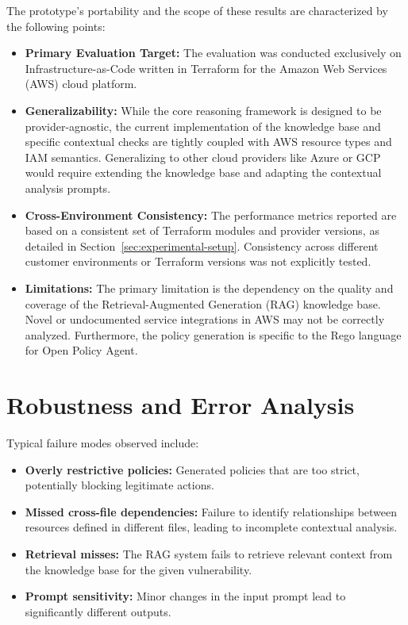 The prototype's portability and the scope of these results are characterized by the following points:
\begin{itemize}
    \item \textbf{Primary Evaluation Target:} The evaluation was conducted exclusively on Infrastructure-as-Code written in Terraform for the Amazon Web Services (AWS) cloud platform.
    \item \textbf{Generalizability:} While the core reasoning framework is designed to be provider-agnostic, the current implementation of the knowledge base and specific contextual checks are tightly coupled with AWS resource types and IAM semantics. Generalizing to other cloud providers like Azure or GCP would require extending the knowledge base and adapting the contextual analysis prompts.
    \item \textbf{Cross-Environment Consistency:} The performance metrics reported are based on a consistent set of Terraform modules and provider versions, as detailed in Section~\ref{sec:experimental-setup}. Consistency across different customer environments or Terraform versions was not explicitly tested.
    \item \textbf{Limitations:} The primary limitation is the dependency on the quality and coverage of the Retrieval-Augmented Generation (RAG) knowledge base. Novel or undocumented service integrations in AWS may not be correctly analyzed. Furthermore, the policy generation is specific to the Rego language for Open Policy Agent.
\end{itemize}

\section{Robustness and Error Analysis}\label{sec:robustness-error}

Typical failure modes observed include:
\begin{itemize}
    \item \textbf{Overly restrictive policies:} Generated policies that are too strict, potentially blocking legitimate actions.
    \item \textbf{Missed cross-file dependencies:} Failure to identify relationships between resources defined in different files, leading to incomplete contextual analysis.
    \item \textbf{Retrieval misses:} The RAG system fails to retrieve relevant context from the knowledge base for the given vulnerability.
    \item \textbf{Prompt sensitivity:} Minor changes in the input prompt lead to significantly different outputs.
\end{itemize}

